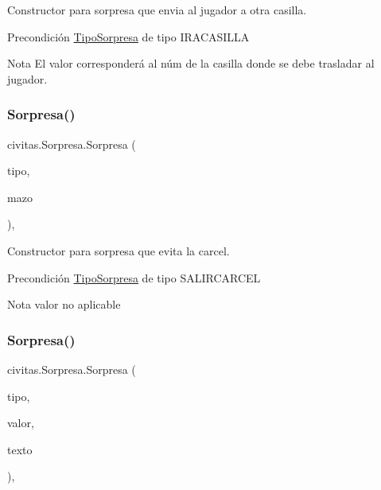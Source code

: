 Constructor para sorpresa que envia al jugador a otra casilla. \begin{DoxyPrecond}{Precondición}
\hyperlink{enumcivitas_1_1TipoSorpresa}{Tipo\+Sorpresa} de tipo I\+R\+A\+C\+A\+S\+I\+L\+LA 
\end{DoxyPrecond}
\begin{DoxyNote}{Nota}
El valor corresponderá al núm de la casilla donde se debe trasladar al jugador. 
\end{DoxyNote}
\mbox{\label{classcivitas_1_1Sorpresa_a8476d67edfec1d155247a78ac79c30fa}} 
\subsubsection{\texorpdfstring{Sorpresa()}{Sorpresa()}\hspace{0.1cm}{\footnotesize\ttfamily [3/4]}}
{\footnotesize\ttfamily civitas.\+Sorpresa.\+Sorpresa (\begin{DoxyParamCaption}\item[{\hyperlink{enumcivitas_1_1TipoSorpresa}{Tipo\+Sorpresa}}]{tipo,  }\item[{\hyperlink{classcivitas_1_1MazoSorpresas}{Mazo\+Sorpresas}}]{mazo }\end{DoxyParamCaption})\hspace{0.3cm}{\ttfamily [inline]}, {\ttfamily [package]}}

Constructor para sorpresa que evita la carcel. \begin{DoxyPrecond}{Precondición}
\hyperlink{enumcivitas_1_1TipoSorpresa}{Tipo\+Sorpresa} de tipo S\+A\+L\+I\+R\+C\+A\+R\+C\+EL 
\end{DoxyPrecond}
\begin{DoxyNote}{Nota}
valor no aplicable 
\end{DoxyNote}
\mbox{\label{classcivitas_1_1Sorpresa_ac8329d952018aea614627c895669b262}} 
\subsubsection{\texorpdfstring{Sorpresa()}{Sorpresa()}\hspace{0.1cm}{\footnotesize\ttfamily [4/4]}}
{\footnotesize\ttfamily civitas.\+Sorpresa.\+Sorpresa (\begin{DoxyParamCaption}\item[{\hyperlink{enumcivitas_1_1TipoSorpresa}{Tipo\+Sorpresa}}]{tipo,  }\item[{int}]{valor,  }\item[{String}]{texto }\end{DoxyParamCaption})\hspace{0.3cm}{\ttfamily [inline]}, {\ttfamily [package]}}

